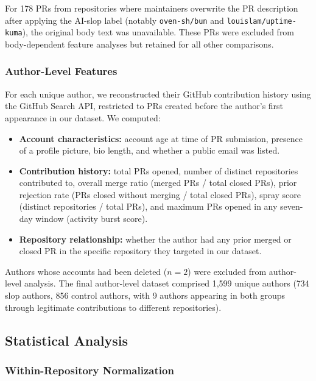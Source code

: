 \documentclass[11pt]{article}
\begin{document}
	For 178 PRs from repositories where maintainers overwrite the PR description after applying the AI-slop label (notably \texttt{oven-sh/bun} and \texttt{louislam/uptime-kuma}), the original body text was unavailable. These PRs were excluded from body-dependent feature analyses but retained for all other comparisons.
	
	\subsubsection{Author-Level Features}
	
	For each unique author, we reconstructed their GitHub contribution history using the GitHub Search API, restricted to PRs created before the author's first appearance in our dataset. We computed:
	
	\begin{itemize}
		\item \textbf{Account characteristics:} account age at time of PR submission, presence of a profile picture, bio length, and whether a public email was listed.
		
		\item \textbf{Contribution history:} total PRs opened, number of distinct repositories contributed to, overall merge ratio (merged PRs / total closed PRs), prior rejection rate (PRs closed without merging / total closed PRs), spray score (distinct repositories / total PRs), and maximum PRs opened in any seven-day window (activity burst score).
		
		\item \textbf{Repository relationship:} whether the author had any prior merged or closed PR in the specific repository they targeted in our dataset.
	\end{itemize}
	
	Authors whose accounts had been deleted ($n = 2$) were excluded from author-level analysis. The final author-level dataset comprised 1,599 unique authors (734 slop authors, 856 control authors, with 9 authors appearing in both groups through legitimate contributions to different repositories).
	
	\subsection{Statistical Analysis}
	
	\subsubsection{Within-Repository Normalization}
	
\end{document}

